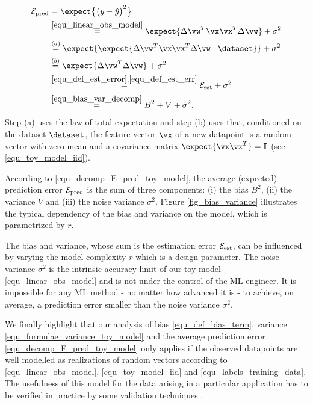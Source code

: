 \documentclass[12pt]{report}
\begin{document}
\begin{align} 
\label{equ_decomp_E_pred_toy_model}
\mathcal{E}_{\rm pred} & = \expect \big\{ \big( y - \hat{y} \big)^2 \big\} \nonumber \\
& \stackrel{\eqref{equ_linear_obs_model}}{=} \expect \{ \Delta \vw^{T} \vx \vx^{T} \Delta \vw \} + \sigma^{2}   \nonumber \\
& \stackrel{(a)}{=} \expect \{ \expect \{ \Delta \vw^{T} \vx \vx^{T} \Delta \vw \mid \dataset \} \} + \sigma^{2}  \nonumber \\
& \stackrel{(b)}{=} \expect \{ \Delta \vw^{T} \Delta \vw \}  + \sigma^{2}  \nonumber \\
& \stackrel{\eqref{equ_def_est_error},\eqref{equ_def_est_err}}{=} \mathcal{E}_{\rm est} + \sigma^{2} \nonumber \\
& \stackrel{\eqref{equ_bias_var_decomp}}{=} B^{2} + V + \sigma^{2}. 
\end{align} 
Step (a) uses the law of total expectation \cite{BillingsleyProbMeasure} and 
step (b) uses that, conditioned on the dataset $\dataset$, the feature vector 
$\vx$ of a new datapoint is a random vector with zero mean and a 
covariance matrix $\expect \{ \vx \vx^{T}\}=\mathbf{I}$ (see \eqref{equ_toy_model_iid}). 

According to \eqref{equ_decomp_E_pred_toy_model}, the average (expected) 
prediction error $\mathcal{E}_{\rm pred}$ is the sum of three components: (i) 
the bias $B^{2}$, (ii) the variance $V$ and (iii) the noise variance $\sigma^{2}$. 
Figure \ref{fig_bias_variance} illustrates the typical dependency of the bias and 
variance on the model, which is parametrized by $r$. 

The bias and variance, whose sum is the estimation error $\mathcal{E}_{\rm est}$, 
can be influenced by varying the model complexity $r$ which is a design parameter. 
The noise variance $\sigma^{2}$ is the intrinsic accuracy limit of our toy model \eqref{equ_linear_obs_model} 
and is not under the control of the ML engineer. It is impossible for 
any ML method - no matter how advanced it is - to achieve, 
on average, a prediction error smaller than the noise variance $\sigma^{2}$. 

We finally highlight that our analysis of bias \eqref{equ_def_bias_term}, 
variance \eqref{equ_formulae_variance_toy_model} and the average prediction 
error \eqref{equ_decomp_E_pred_toy_model} only applies if the observed 
datapoints are well modelled as realizations of random vectors according 
to \eqref{equ_linear_obs_model}, \eqref{equ_toy_model_iid} and \eqref{equ_labels_training_data}. 
The usefulness of this model for the data arising in a particular application 
has to be verified in practice by some validation techniques \cite{Young93,Vasicek76}. 
\end{document}

